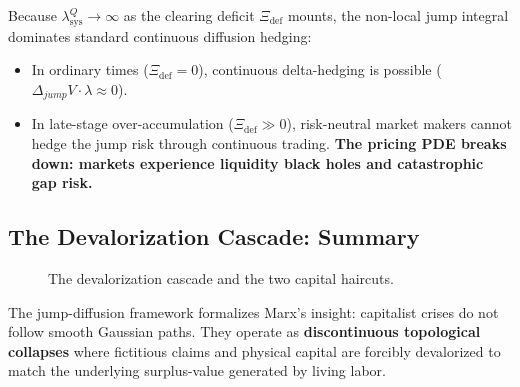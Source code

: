 \documentclass[11pt,letterpaper]{report}
\begin{document}
Because ${\lambda }_{\mathrm{sys}}^{Q}\rightarrow \infty$ as the clearing deficit ${\Xi }_{\mathrm{def}}$ mounts, the non-local jump integral dominates standard continuous diffusion hedging:

\begin{itemize}
\item In ordinary times (${\Xi }_{\mathrm{def}}=0$), continuous delta-hedging is possible (${\Delta }_{jump}V\cdot \lambda \approx 0$).
\item In late-stage over-accumulation (${\Xi }_{\mathrm{def}}\gg 0$), risk-neutral market makers cannot hedge the jump risk through continuous trading. \textbf{The pricing PDE breaks down: markets experience liquidity black holes and catastrophic gap risk.}
\end{itemize}
\subsection{The Devalorization Cascade: Summary}

\begin{figure}[H]\centering
{}
\caption{The devalorization cascade and the two capital haircuts.}
\end{figure}
The jump-diffusion framework formalizes Marx's insight: capitalist crises do not follow smooth Gaussian paths. They operate as \textbf{discontinuous topological collapses} where fictitious claims and physical capital are forcibly devalorized to match the underlying surplus-value generated by living labor.
\end{document}
